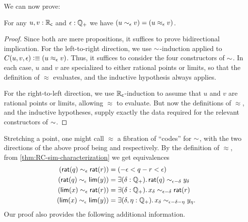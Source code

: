 We can now prove:

\begin{thm}\label{thm:RC-sim-characterization}
  For any $u,v:\mathbb{R}_\mathsf{c}$ and $\epsilon:\mathbb{Q}_{+}$ we have $(u\sim_{\epsilon} v) = (u\approx_\epsilon v)$.
\end{thm}
\begin{proof}
  Since both are mere propositions, it suffices to prove bidirectional implication.
  For the left-to-right direction, we use $\mathord\sim$-induction applied to $C(u,v,\epsilon)\vcentcolon\equiv (u\approx_\epsilon v)$.
  Thus, it suffices to consider the four constructors of $\mathord\sim$.
  In each case, $u$ and $v$ are specialized to either rational points or limits, so that the definition of $\approx$ evaluates, and the inductive hypothesis always applies.

  For the right-to-left direction, we use $\mathbb{R}_\mathsf{c}$-induction to assume that $u$ and $v$ are rational points or limits, allowing $\approx$ to evaluate.
  But now the definitions of $\approx$, and the inductive hypotheses, supply exactly the data required for the relevant constructors of $\mathord\sim$.
\end{proof}

%
Stretching a point, one might call $\approx$ a fibration of ``codes'' for $\mathord\sim$, with the two directions of the above proof being \encode and \decode respectively.
By the definition of $\approx$, from \autoref{thm:RC-sim-characterization} we get equivalences
\begin{align*}
  (\rcrat(q) \close\epsilon \rcrat(r))  &=
  (-\epsilon < q - r < \epsilon)\\
  (\rcrat(q) \close\epsilon \rclim(y)) &=
  \exis{\delta : \Qp} \rcrat(q) \close{\epsilon - \delta} y_\delta\\
  (\rclim(x) \close\epsilon \rcrat(r)) &=
  \exis{\delta : \Qp} x_\delta \close{\epsilon - \delta} \rcrat(r)\\
  (\rclim(x) \close\epsilon \rclim(y)) &=
  \exis{\delta, \eta : \Qp} x_\delta \close{\epsilon - \delta - \eta} y_\eta.
\end{align*}
Our proof also provides the following additional information.

